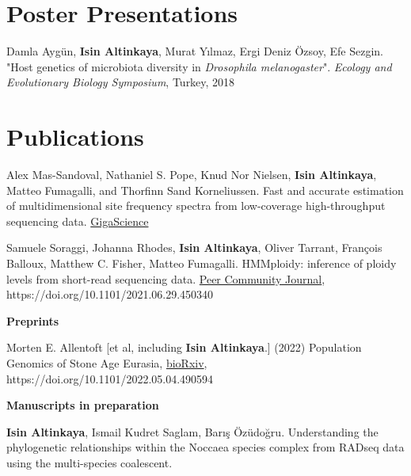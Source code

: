 \documentclass[letterpaper,10.5pt]{article}
\begin{document}
\section{Poster Presentations}
Damla Aygün, \textbf{Isin Altinkaya}, Murat Y{\i}lmaz, Ergi Deniz \"{O}zsoy, Efe Sezgin. "Host genetics of microbiota diversity in \textit{Drosophila melanogaster}". \textit{Ecology and Evolutionary Biology Symposium}, Turkey, 2018 \\

\section{Publications}



Alex Mas-Sandoval, Nathaniel S. Pope, Knud Nor Nielsen, \textbf{Isin Altinkaya}, Matteo Fumagalli, and Thorfinn Sand Korneliussen. Fast and accurate estimation of multidimensional site frequency spectra from low-coverage high-throughput sequencing data. \href{https://doi.org/10.1093/gigascience/giac032}{GigaScience}  \\

\medskip


Samuele Soraggi, Johanna Rhodes, \textbf{Isin Altinkaya}, Oliver Tarrant, François Balloux, Matthew C. Fisher, Matteo Fumagalli. HMMploidy: inference of ploidy levels from short-read sequencing data. \href{https://doi.org/10.24072/pcjournal.178}{Peer Community Journal}, https://doi.org/10.1101/2021.06.29.450340 \\
\medskip

\textbf{Preprints} \\
\medskip

Morten E. Allentoft [et al, including \textbf{Isin Altinkaya}.] (2022) Population Genomics of Stone Age Eurasia, \href{https://www.biorxiv.org/content/10.1101/2022.05.04.490594v5}{bioRxiv}, https://doi.org/10.1101/2022.05.04.490594  \\

\medskip

\textbf{Manuscripts in preparation} \\
\medskip


\textbf{Isin Altinkaya}, Ismail Kudret Saglam, Bar{\i}\c{s} \"{O}z\"{u}do\u{g}ru. Understanding the phylogenetic relationships within the Noccaea species complex from RADseq data using the multi-species coalescent. \\
\end{document}
